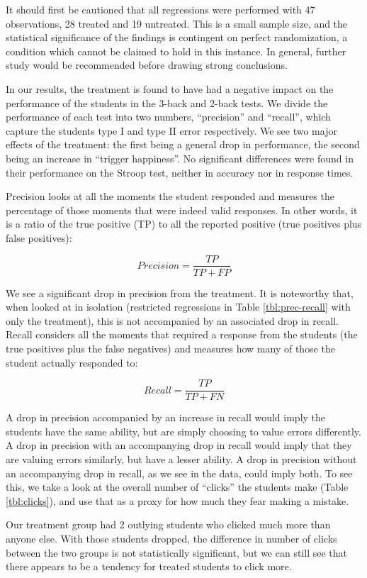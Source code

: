 \documentclass[a4paper,12pt]{article}
\begin{document}
It should first be cautioned that all regressions were performed with 47 observations, 28 treated and 19 untreated. This is a small sample size, and the statistical significance of the findings is contingent on perfect randomization, a condition which cannot be claimed to hold in this instance. In general, further study would be recommended before drawing strong conclusions.

In our results, the treatment is found to have had a negative impact on the performance of the students in the 3-back and 2-back tests. We divide the performance of each test into two numbers, ``precision'' and ``recall'', which capture the students type I and type II error respectively. We see two major effects of the treatment: the first being a general drop in performance, the second being an increase in ``trigger happiness''. No significant differences were found in their performance on the Stroop test, neither in accuracy nor in response times.

Precision looks at all the moments the student responded and measures the percentage of those moments that were indeed valid responses. In other words, it is a ratio of the true positive (TP) to all the reported positive (true positives plus false positives):

$$
Precision = \frac{TP}{TP + FP}
$$

We see a significant drop in precision from the treatment. It is noteworthy that, when looked at in isolation (restricted regressions in Table \ref{tbl:prec-recall} with only the treatment), this is not accompanied by an associated drop in recall. Recall considers all the moments that required a response from the students (the true positives plus the false negatives) and measures how many of those the student actually responded to:

$$
Recall = \frac{TP}{TP + FN}
$$

A drop in precision accompanied by an increase in recall would imply the students have the same ability, but are simply choosing to value errors differently. A drop in precision with an accompanying drop in recall would imply that they are valuing errors similarly, but have a lesser ability. A drop in precision without an accompanying drop in recall, as we see in the data, could imply both. To see this, we take a look at the overall number of ``clicks'' the students make (Table \ref{tbl:clicks}), and use that as a proxy for how much they fear making a mistake.

Our treatment group had 2 outlying students who clicked much more than anyone else. With those students dropped, the difference in number of clicks between the two groups is not statistically significant, but we can still see that there appears to be a tendency for treated students to click more.
\end{document}
